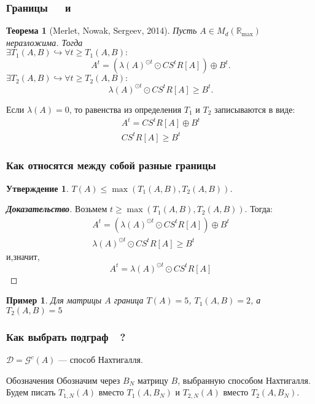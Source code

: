 \documentclass{beamer}
\newtheorem*{Th}{Теорема}
\newtheorem*{Prop}{Утверждение}
\newtheorem*{Exmpl}{Пример}
\newcommand{\cwhite}[1]{\textcolor{white}{#1}}
\begin{document}
\begin{frame}
\frametitle{Границы $\cwhite{T_1}$ и $\cwhite{T_2}$}
\begin{Th}[Merlet, Nowak, Sergeev, 2014]
Пусть $A \in M_d(\mathbb{R}_{\max})$ неразложима. Тогда \\$\exists T_1(A, B) \hookrightarrow \forall t \ge T_1(A, B):$
\begin{equation*}
    A^t = (\lambda(A)^{\odot t} \odot CS^tR[A]) \oplus B^t.
\end{equation*}
$\exists T_2(A, B) \hookrightarrow \forall t \ge T_2(A, B):$
\begin{equation*}
    \lambda(A)^{\odot t} \odot CS^tR[A] \ge B^t.
\end{equation*}

\end{Th}
Если $\lambda(A) = 0$, то равенства из определения $T_1$ и $T_2$ записываются в виде:
\begin{gather*}
A^t = CS^tR[A] \oplus B^t \\
	  CS^tR[A] \ge B^t
\end{gather*}
\end{frame}


\begin{frame}
\frametitle{Как относятся между собой разные границы}
\begin{Prop}
$T(A) \le \max(T_1(A, B), T_2(A, B))$.
\end{Prop}
\begin{proof}[\textbf{Доказательство}]
Возьмем $t \ge \max(T_1(A, B), T_2(A, B))$. Тогда:
\begin{gather*}
A^t = (\lambda(A)^{\odot t} \odot CS^tR[A]) \oplus B^t \\
\lambda(A)^{\odot t} \odot CS^tR[A] \ge B^t
\end{gather*}
и,значит,
\begin{equation*}
A^t = \lambda(A)^{\odot t} \odot CS^tR[A]
\end{equation*}
\end{proof}
\begin{Exmpl}
Для матрицы $A$ граница $T(A) = 5$, $T_1(A, B) = 2$, а $T_2(A, B) = 5$
\end{Exmpl}
\end{frame}


\begin{frame}
\frametitle{Как выбрать подграф $\cwhite{\mathcal{D}}$?}
$\mathcal{D} = \mathcal{G}^c(A)$ --- способ Нахтигалля.
\begin{block}{Обозначения}
Обозначим через $B_N$ матрицу $B$, выбранную способом Нахтигалля.\\
Будем писать $T_{1, N}(A)$ вместо $T_1(A, B_N)$ и $T_{2, N}(A)$ вместо $T_2(A, B_N)$.
\end{block}
\end{frame}
\end{document}
